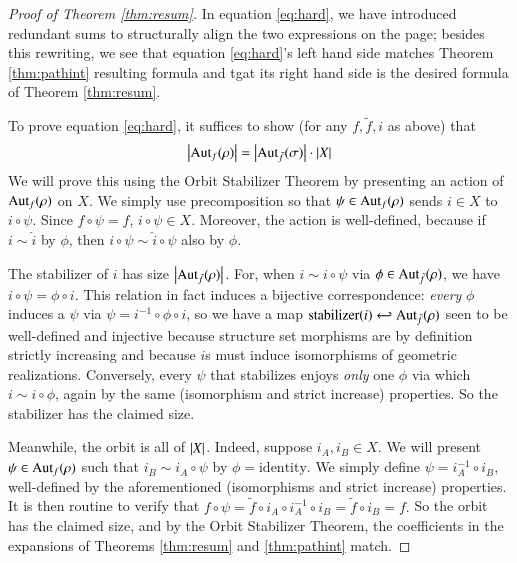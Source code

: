 \begin{proof}[Proof of Theorem \ref{thm:resum}]
            In equation \ref{eq:hard}, we have introduced
            redundant sums to structurally align the two expressions on the
            page; besides this rewriting, we see that equation \ref{eq:hard}'s
            left hand side matches Theorem \ref{thm:pathint} resulting formula
            and tgat its right hand side is the desired formula of Theorem
            \ref{thm:resum}. 

            To prove equation \ref{eq:hard}, it suffices to show (for any
            $f, \tilde f, i$ as above) that
            $$
                \left|\text{\textnormal{Aut}}_f(\rho)\right|
                =
                \left|\text{\textnormal{Aut}}_{\tilde f}(\sigma)\right|
                \cdot
                \left|X\right|
            $$
            We will prove this using the Orbit Stabilizer Theorem by presenting
            an action of $\text{\textnormal{Aut}}_f(\rho)$ on $X$.  We simply use precomposition
            so that $\psi\in \text{\textnormal{Aut}}_f(\rho)$ sends $i\in X$ to $i\circ \psi$.
            Since $f\circ\psi = f$, $i\circ \psi \in X$.  Moreover, the action
            is well-defined, because if $i\sim \hat i$ by $\phi$, then $i \circ
            \psi \sim \hat i \circ \psi$ also by $\phi$.
            
            The stabilizer of $i$ has size $\left|\text{\textnormal{Aut}}_{\tilde f}(\rho)\right|$.
            For, when $i \sim i \circ \psi$ via $\phi \in \text{\textnormal{Aut}}_{\tilde
            f}(\rho)$, we have $i\circ \psi = \phi \circ i$.  This relation in
            fact induces a bijective correspondence: \emph{every} $\phi$
            induces a $\psi$ via $\psi = i^{-1} \circ \phi \circ i$, so we have
            a map $\text{stabilizer}(i) \hookleftarrow \text{\textnormal{Aut}}_{\tilde f}(\rho)$
            seen to be well-defined and injective because structure set
            morphisms are by definition strictly increasing and because $i$s
            must induce isomorphisms of geometric realizations.  Conversely,
            every $\psi$ that stabilizes enjoys \emph{only} one $\phi$ via
            which $i \sim i \circ \phi$, again by the same (isomorphism and
            strict increase) properties.  So the stabilizer has the claimed
            size.

            Meanwhile, the orbit is all of $\left|X\right|$.  Indeed, suppose $i_A,
            i_B \in X$.  We will present $\psi \in \text{\textnormal{Aut}}_f(\rho)$ such that $i_B
            \sim i_A \circ \psi$ by $\phi=\text{identity}$.  We simply define
            $\psi = i_A^{-1} \circ i_B$, well-defined by the aforementioned
            (isomorphisms and strict increase) properties.  It is then routine
            to verify that
            $
                f \circ \psi
                =
                \tilde f \circ i_A \circ i_A^{-1} \circ i_B
                =
                \tilde f \circ i_B
                = f.
            $
            So the orbit has the claimed size, and by the Orbit Stabilizer
            Theorem, the coefficients in the expansions of Theorems 
            \ref{thm:resum} and \ref{thm:pathint} match.
        \end{proof}


